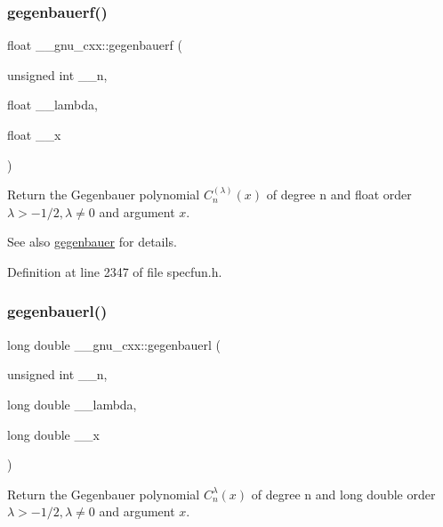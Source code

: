 \subsubsection{\texorpdfstring{gegenbauerf()}{gegenbauerf()}}
{\footnotesize\ttfamily float \+\_\+\+\_\+gnu\+\_\+cxx\+::gegenbauerf (\begin{DoxyParamCaption}\item[{unsigned int}]{\+\_\+\+\_\+n,  }\item[{float}]{\+\_\+\+\_\+lambda,  }\item[{float}]{\+\_\+\+\_\+x }\end{DoxyParamCaption})\hspace{0.3cm}{\ttfamily [inline]}}

Return the Gegenbauer polynomial $ C_n^{(\lambda)}(x) $ of degree {\ttfamily n} and {\ttfamily float} order $ \lambda > -1/2, \lambda \neq 0 $ and argument $ x $.

\begin{DoxySeeAlso}{See also}
\hyperlink{group__gnu__math__spec__func_ga512e7981e328d6184f604de1892048b6}{gegenbauer} for details. 
\end{DoxySeeAlso}


Definition at line 2347 of file specfun.\+h.

\mbox{\label{group__gnu__math__spec__func_ga1f1110d7a116bd5636924bb96d24ecc3}} 
\subsubsection{\texorpdfstring{gegenbauerl()}{gegenbauerl()}}
{\footnotesize\ttfamily long double \+\_\+\+\_\+gnu\+\_\+cxx\+::gegenbauerl (\begin{DoxyParamCaption}\item[{unsigned int}]{\+\_\+\+\_\+n,  }\item[{long double}]{\+\_\+\+\_\+lambda,  }\item[{long double}]{\+\_\+\+\_\+x }\end{DoxyParamCaption})\hspace{0.3cm}{\ttfamily [inline]}}

Return the Gegenbauer polynomial $ C_n^{\lambda}(x) $ of degree {\ttfamily n} and {\ttfamily long double} order $ \lambda > -1/2, \lambda \neq 0 $ and argument $ x $.

